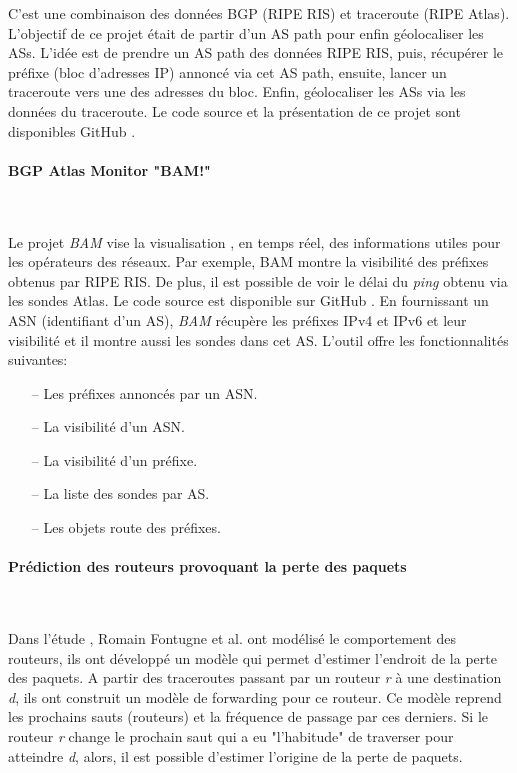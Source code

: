 C'est une combinaison des données BGP (RIPE RIS) et traceroute (RIPE Atlas). L'objectif de ce projet était de partir d'un AS path pour enfin géolocaliser les ASs. 
L'idée est de prendre un AS path des données RIPE RIS, puis, récupérer le préfixe (bloc d'adresses IP) annoncé via cet AS path, ensuite, lancer un traceroute vers une des adresses du bloc. Enfin, géolocaliser les ASs via les données du traceroute. 
Le code source et la présentation de ce projet sont disponibles GitHub \cite{bgp-traceroutes,pres-bgp-traceroute}. 


\paragraph{BGP Atlas Monitor "BAM!"} ~

Le projet \textit{BAM} vise la visualisation , en temps réel,  des informations utiles pour les opérateurs des réseaux. Par exemple, BAM montre  la visibilité des préfixes obtenus par RIPE RIS. De plus,  il est possible de voir  le délai du \textit{ping} obtenu via les sondes   Atlas. Le code source est disponible sur  GitHub \cite{bam}. En fournissant un ASN (identifiant d'un AS), \textit{BAM} récupère les préfixes IPv4 et IPv6 et leur visibilité et il montre aussi les sondes dans cet AS. L'outil offre  les  fonctionnalités suivantes:
\begin{itemize}
	\item[--] Les préfixes annoncés par un ASN.
	\item[--] La visibilité d'un ASN.
	\item[--] La visibilité d'un préfixe.
	\item[--] La liste des sondes par AS.
	\item[--] Les objets  route des préfixes.
\end{itemize}

\paragraph{Prédiction des routeurs provoquant la perte des paquets }~

Dans l'étude \cite{DBLP:journals/corr/FontugneAPB16}, Romain Fontugne et al. ont modélisé le comportement  des routeurs, ils ont développé un modèle qui permet d'estimer l'endroit de la  perte des paquets. A partir des traceroutes passant par un routeur \textit{r} à une destination \textit{d}, ils ont construit un modèle de forwarding pour ce routeur. Ce modèle reprend les prochains sauts (routeurs) et la fréquence de passage par ces derniers. Si le routeur \textit{r} change le prochain saut qui a eu "l'habitude" de traverser  pour atteindre \textit{d}, alors, il est possible d'estimer l'origine  de la perte de paquets.

